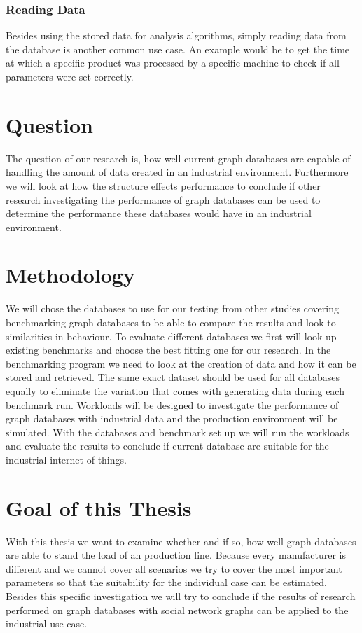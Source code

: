 \subsubsection{Reading Data}
Besides using the stored data for analysis algorithms,
simply reading data from the database is another common use case.
An example would be to get the time at which a specific product was processed by a specific machine to check if all parameters were set correctly.

\section{Question}
The question of our research is,
how well current graph databases are capable of handling the amount of data created in an industrial environment.
Furthermore we will look at how the structure effects performance to conclude if other research investigating the performance of graph databases can be used to determine the performance these databases would have in an industrial environment.

\section{Methodology}
We will chose the databases to use for our testing from other studies covering benchmarking graph databases to be able to compare the results and look to similarities in behaviour.
To evaluate different databases we first will look up existing benchmarks and choose the best fitting one for our research.
In the benchmarking program we need to look at the creation of data and how it can be stored and retrieved.
The same exact dataset should be used for all databases equally to eliminate the variation that comes with generating data during each benchmark run.
Workloads will be designed to investigate the performance of graph databases with industrial data and the production environment will be simulated.
With the databases and benchmark set up we will run the workloads and evaluate the results to conclude if current database are suitable for the industrial internet of things.

\section{Goal of this Thesis}
With this thesis we want to examine whether and if so,
how well graph databases are able to stand the load of an production line.
Because every manufacturer is different and we cannot cover all scenarios we try to cover the most important parameters
so that the suitability for the individual case can be estimated.
Besides this specific investigation we will try to conclude if the results of research performed on graph databases with social network graphs can be applied to the industrial use case.

